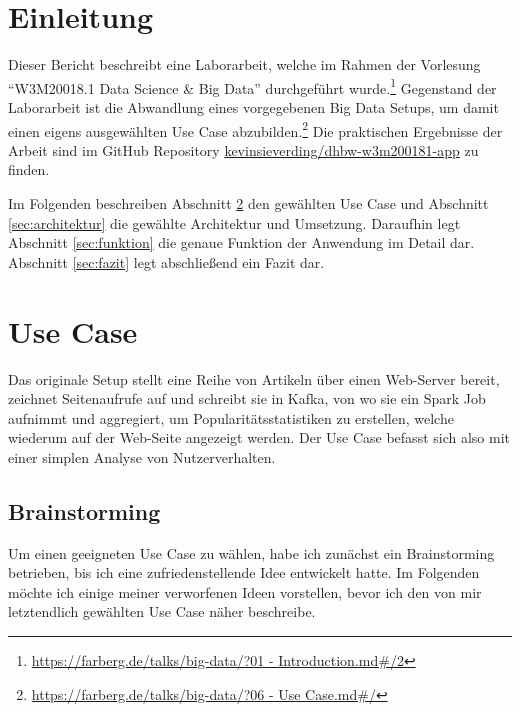 
\section{Einleitung}\label{sec:einleitung}

Dieser Bericht beschreibt eine Laborarbeit, welche im Rahmen der Vorlesung \enquote{W3M20018.1 Data Science \& Big Data} durchgeführt wurde.\footnote{\href{https://farberg.de/talks/big-data/?01\%20-\%20Introduction.md\#/2}{https://farberg.de/talks/big-data/?01 - Introduction.md\#/2}}
Gegenstand der Laborarbeit ist die Abwandlung eines vorgegebenen Big Data Setups, um damit einen eigens ausgewählten Use Case abzubilden.\footnote{\href{https://farberg.de/talks/big-data/?06\%20-\%20Use\%20Case.md\#/}{https://farberg.de/talks/big-data/?06 - Use Case.md\#/}}
Die praktischen Ergebnisse der Arbeit sind im GitHub Repository \href{https://github.com/kevinsieverding/dhbw-w3m200181-app}{kevinsieverding/dhbw-w3m200181-app} zu finden.

Im Folgenden beschreiben Abschnitt \ref{sec:use-case} den gewählten Use Case und Abschnitt \ref{sec:architektur} die gewählte Architektur und Umsetzung.
Daraufhin legt Abschnitt \ref{sec:funktion} die genaue Funktion der Anwendung im Detail dar.
Abschnitt \ref{sec:fazit} legt abschließend ein Fazit dar.

\section{Use Case}\label{sec:use-case}

Das originale Setup stellt eine Reihe von Artikeln über einen Web-Server bereit, zeichnet Seitenaufrufe auf und schreibt sie in Kafka, von wo sie ein Spark Job aufnimmt und aggregiert, um Popularitätsstatistiken zu erstellen, welche wiederum auf der Web-Seite angezeigt werden.
Der Use Case befasst sich also mit einer simplen Analyse von Nutzerverhalten.

\subsection{Brainstorming}

Um einen geeigneten Use Case zu wählen, habe ich zunächst ein Brainstorming betrieben, bis ich eine zufriedenstellende Idee entwickelt hatte.
Im Folgenden möchte ich einige meiner verworfenen Ideen vorstellen, bevor ich den von mir letztendlich gewählten Use Case näher beschreibe.


